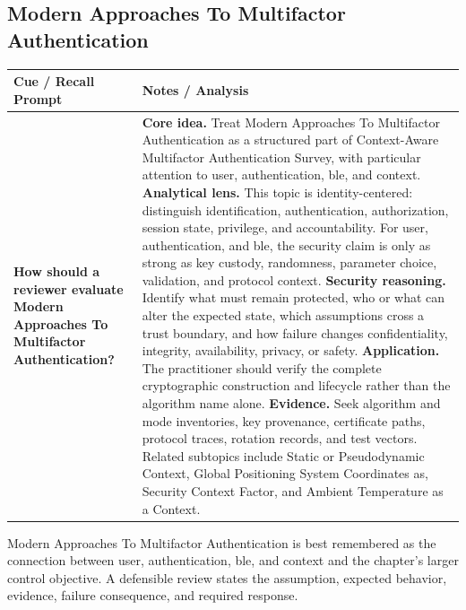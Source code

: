 \documentclass[11pt]{article}
\newcommand{\CornellHeader}{%
\rowcolor{Navy}\color{white}\bfseries Cue / Recall Prompt & \color{white}\bfseries Notes / Analysis\\\hline}
\newcommand{\CornellRow}[2]{%
\cellcolor{CueGray}\RaggedRight\textbf{#1} & \RaggedRight #2\\\hline}
\begin{document}
\subsection*{Modern Approaches To Multifactor Authentication}
\begin{longtable}{>{\RaggedRight\arraybackslash}p{}|>{\RaggedRight\arraybackslash}p{}}
\CornellHeader
\CornellRow{How should a reviewer evaluate Modern Approaches To Multifactor Authentication?}{\textbf{Core idea.} Treat Modern Approaches To Multifactor Authentication as a structured part of Context-Aware Multifactor Authentication Survey, with particular attention to user, authentication, ble, and context. \textbf{Analytical lens.} This topic is identity-centered: distinguish identification, authentication, authorization, session state, privilege, and accountability. For user, authentication, and ble, the security claim is only as strong as key custody, randomness, parameter choice, validation, and protocol context. \textbf{Security reasoning.} Identify what must remain protected, who or what can alter the expected state, which assumptions cross a trust boundary, and how failure changes confidentiality, integrity, availability, privacy, or safety. \textbf{Application.} The practitioner should verify the complete cryptographic construction and lifecycle rather than the algorithm name alone. \textbf{Evidence.} Seek algorithm and mode inventories, key provenance, certificate paths, protocol traces, rotation records, and test vectors. Related subtopics include Static or Pseudodynamic Context, Global Positioning System Coordinates as, Security Context Factor, and Ambient Temperature as a Context.}
\end{longtable}
\begin{topicsummary}
Modern Approaches To Multifactor Authentication is best remembered as the connection between user, authentication, ble, and context and the chapter's larger control objective. A defensible review states the assumption, expected behavior, evidence, failure consequence, and required response.
\end{topicsummary}
\end{document}
